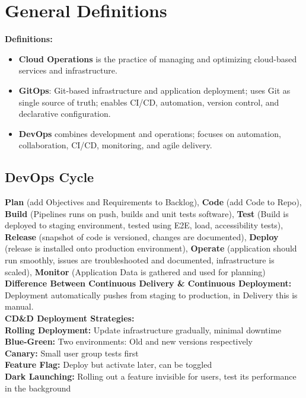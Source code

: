 \section{General Definitions}
\textbf{Definitions:}
\begin{itemize}

	\item \textbf{Cloud Operations} is the practice of managing and optimizing cloud-based services and infrastructure.
	\item \textbf{GitOps}: Git-based infrastructure and application deployment; uses Git as single source of truth; enables CI/CD, automation, version control, and declarative configuration.

	\item \textbf{DevOps} combines development and operations; focuses on automation, collaboration, CI/CD, monitoring, and agile delivery.
\end{itemize}
\subsection{DevOps Cycle}
\textbf{Plan} (add Objectives and Requirements to Backlog), \textbf{Code} (add Code to Repo), \textbf{Build} (Pipelines runs on push, builds and unit tests software), \textbf{Test} (Build is deployed to staging environment, tested using E2E, load, accessibility tests), \textbf{Release} (snapshot of code is versioned, changes are documented), \textbf{Deploy} (release is installed onto production environment), \textbf{Operate} (application should run smoothly, issues are troubleshooted and documented, infrastructure is scaled), \textbf{Monitor} (Application Data is gathered and used for planning) \\
\textbf{Difference Between Continuous Delivery \& Continuous Deployment:} Deployment automatically pushes from staging to production, in Delivery this is manual. \\
\textbf{CD\&D Deployment Strategies:} \\
\textbf{Rolling Deployment:} Update infrastructure gradually, minimal downtime \\
\textbf{Blue-Green:} Two environments: Old and new versions respectively \\
\textbf{Canary:} Small user group tests first \\
\textbf{Feature Flag:} Deploy but activate later, can be toggled \\
\textbf{Dark Launching:} Rolling out a feature invisible for users, test its performance in the background
